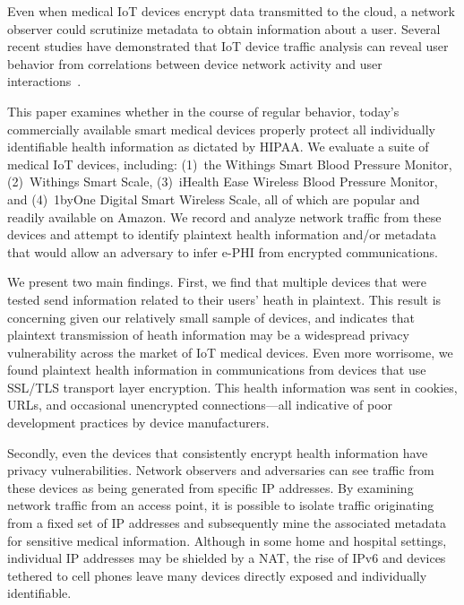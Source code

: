 Even when medical IoT devices encrypt data transmitted to the cloud, a network
observer could scrutinize metadata to obtain information about a user.
Several recent studies have demonstrated that IoT device traffic analysis can
reveal user behavior  from correlations between device network activity and
user interactions~\cite{apthorpeIoT}.

This paper examines whether in the course of regular behavior, today's
commercially available smart medical devices properly protect all individually
identifiable health information as dictated by HIPAA.  We evaluate a suite of
medical IoT devices, including: (1)~the Withings Smart Blood Pressure Monitor,
(2)~Withings Smart Scale, (3)~iHealth Ease Wireless Blood Pressure Monitor, and (4)~1byOne
Digital Smart Wireless Scale, all of which are popular and readily available
on Amazon. We record and analyze network traffic from these devices and
attempt to identify plaintext health information and/or metadata that would
allow an adversary to infer e-PHI from encrypted communications.

We present two main findings. First, we find that multiple devices that were
tested send information related to their users' heath in plaintext. This
result is concerning given our relatively small sample of devices, and
indicates that plaintext transmission of heath information may be a widespread
privacy vulnerability across the market of IoT medical devices. Even more
worrisome, we found plaintext health information in communications from
devices that use SSL/TLS transport layer encryption. This health information
was sent in cookies, URLs, and occasional unencrypted connections---all
indicative of poor development practices by device manufacturers.

Secondly, even the devices that consistently encrypt health information have privacy
vulnerabilities. Network observers and adversaries can see
traffic from these devices as being generated from specific IP addresses. By
examining network traffic from an access point, it is possible to isolate
traffic originating from a fixed set of IP addresses and subsequently mine the
associated metadata for sensitive medical information. Although in some home and
hospital settings, individual IP addresses may be shielded by a NAT, the rise
of IPv6 and devices tethered to cell phones leave many devices directly exposed
and individually identifiable.

